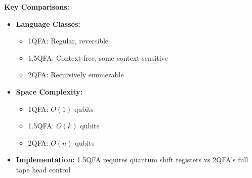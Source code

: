 \textbf{Key Comparisons:}
\begin{itemize}
    \item \textbf{Language Classes:}
    \begin{itemize}
        \item 1QFA: Regular, reversible
        \item 1.5QFA: Context-free, some context-sensitive
        \item 2QFA: Recursively enumerable
    \end{itemize}
    \item \textbf{Space Complexity:}
    \begin{itemize}
        \item 1QFA: $O(1)$ qubits
        \item 1.5QFA: $O(k)$ qubits
        \item 2QFA: $O(n)$ qubits
    \end{itemize}
    \item \textbf{Implementation:} 1.5QFA requires quantum shift registers vs 2QFA's full tape head control
\end{itemize}